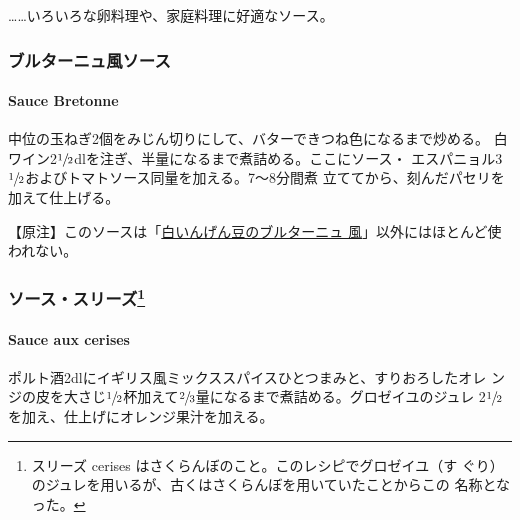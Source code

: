 \documentclass[twoside,12Q,b5j]{escoffierltjsbook}
\newenvironment{recette}{\begin{small}\begin{spacing}{1}\begin{multicols}{2}}{\end{multicols}\end{spacing}\end{small}}
\begin{document}
\begin{recette}
\ldots{}\ldots{}いろいろな卵料理や、家庭料理に好適なソース。

\vspace*{1.7\zw}

\subsubsection{ブルターニュ風ソース}\label{ux30d6ux30ebux30bfux30fcux30cbux30e5ux98a8ux30bdux30fcux30b9}

\paragraph{Sauce Bretonne}\label{sauce-bretonne}


中位の玉ねぎ2個をみじん切りにして、バターできつね色になるまで炒める。
白ワイン2\(\sfrac{1}{2}\)dlを注ぎ、半量になるまで煮詰める。ここにソース・
エスパニョル3\(\sfrac{1}{2}\)およびトマトソース同量を加える。7〜8分間煮
立ててから、刻んだパセリを加えて仕上げる。

【原注】このソースは「\protect\hyperlink{haricots-blancs-a-la-bretonne}{白いんげん豆のブルターニュ
風}」以外にはほとんど使われない。

\vspace*{1.7\zw}

\subsubsection[ソース・スリーズ]{\texorpdfstring{ソース・スリーズ\footnote{スリーズ
  cerises はさくらんぼのこと。このレシピでグロゼイユ（す
  ぐり）のジュレを用いるが、古くはさくらんぼを用いていたことからこの
  名称となった。}}{ソース・スリーズ}}\label{ux30bdux30fcux30b9ux30b9ux30eaux30fcux30ba6}

\paragraph{Sauce aux cerises}\label{sauce-aux-cerises}


ポルト酒2dlにイギリス風ミックススパイスひとつまみと、すりおろしたオレ
ンジの皮を大さじ\(\sfrac{1}{2}\)杯加えて\(\sfrac{2}{3}\)量になるまで煮詰める。グロゼイユのジュレ
2\(\sfrac{1}{2}\)を加え、仕上げにオレンジ果汁を加える。


\end{recette}
\end{document}
